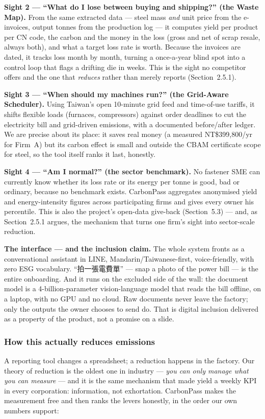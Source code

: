 \documentclass[11pt]{article}
\newcommand{\zh}[1]{{\cjkfont #1}}
\begin{document}
\textbf{Sight 2 --- ``What do I lose between buying and shipping?'' (the Waste Map).} From the same extracted data --- steel mass \emph{and} unit price from the e-invoices, output tonnes from the production log --- it computes yield per product per CN code, the carbon and the money in the loss (gross and net of scrap resale, always both), and what a target loss rate is worth. Because the invoices are dated, it tracks loss month by month, turning a once-a-year blind spot into a control loop that flags a drifting die in weeks. This is the sight no competitor offers and the one that \emph{reduces} rather than merely reports (Section~2.5.1).

\textbf{Sight 3 --- ``When should my machines run?'' (the Grid-Aware Scheduler).} Using Taiwan's open 10-minute grid feed and time-of-use tariffs, it shifts flexible loads (furnaces, compressors) against order deadlines to cut the electricity bill and grid-driven emissions, with a documented before/after ledger. We are precise about its place: it saves real money (a measured NT\$399{,}800/yr for Firm~A) but its carbon effect is small and outside the CBAM certificate scope for steel, so the tool itself ranks it last, honestly.

\textbf{Sight 4 --- ``Am I normal?'' (the sector benchmark).} No fastener SME can currently know whether its loss rate or its energy per tonne is good, bad or ordinary, because no benchmark exists. CarbonPass aggregates anonymised yield and energy-intensity figures across participating firms and gives every owner his percentile. This is also the project's open-data give-back (Section~5.3) --- and, as Section~2.5.1 argues, the mechanism that turns one firm's sight into sector-scale reduction.

\textbf{The interface --- and the inclusion claim.} The whole system fronts as a conversational assistant in LINE, Mandarin/Taiwanese-first, voice-friendly, with zero ESG vocabulary. ``\zh{拍一張電費單}'' --- snap a photo of the power bill --- is the entire onboarding. And it runs on the excluded side of the wall: the document model is a 4-billion-parameter vision-language model that reads the bill offline, on a laptop, with no GPU and no cloud. Raw documents never leave the factory; only the outputs the owner chooses to send do. That is digital inclusion delivered as a property of the product, not a promise on a slide.

\subsubsection{How this actually reduces emissions}
A reporting tool changes a spreadsheet; a reduction happens in the factory. Our theory of reduction is the oldest one in industry --- \emph{you can only manage what you can measure} --- and it is the same mechanism that made yield a weekly KPI in every corporation: information, not exhortation. CarbonPass makes the measurement free and then ranks the levers honestly, in the order our own numbers support:
\end{document}
